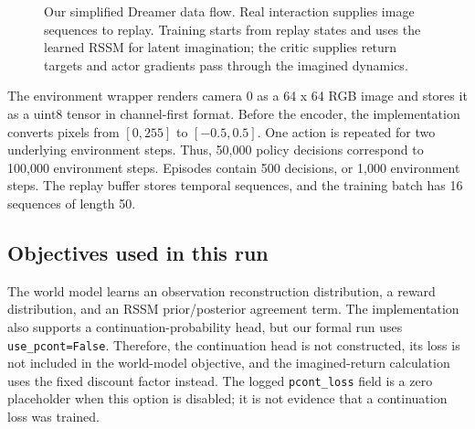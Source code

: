 \documentclass{article}
\begin{document}
\begin{figure}[t]
\centering
\setlength{\fboxsep}{5pt}
\begin{minipage}{0.44\linewidth}
\centering
{}

\vspace{3pt}
\end{minipage}
\hspace{0.04\linewidth}
\begin{minipage}{0.44\linewidth}
\centering
{}

\vspace{3pt}
\end{minipage}
\caption{Our simplified Dreamer data flow. Real interaction supplies image sequences to replay. Training starts from replay states and uses the learned RSSM for latent imagination; the critic supplies return targets and actor gradients pass through the imagined dynamics.}
\label{fig:flow}
\end{figure}

The environment wrapper renders camera 0 as a 64 x 64 RGB image and stores it as a uint8 tensor in channel-first format. Before the encoder, the implementation converts pixels from $[0,255]$ to $[-0.5,0.5]$. One action is repeated for two underlying environment steps. Thus, 50,000 policy decisions correspond to 100,000 environment steps. Episodes contain 500 decisions, or 1,000 environment steps. The replay buffer stores temporal sequences, and the training batch has 16 sequences of length 50.

\subsection{Objectives used in this run}

The world model learns an observation reconstruction distribution, a reward distribution, and an RSSM prior/posterior agreement term. The implementation also supports a continuation-probability head, but our formal run uses \texttt{use\_pcont=False}. Therefore, the continuation head is not constructed, its loss is not included in the world-model objective, and the imagined-return calculation uses the fixed discount factor instead. The logged \texttt{pcont\_loss} field is a zero placeholder when this option is disabled; it is not evidence that a continuation loss was trained.
\end{document}
